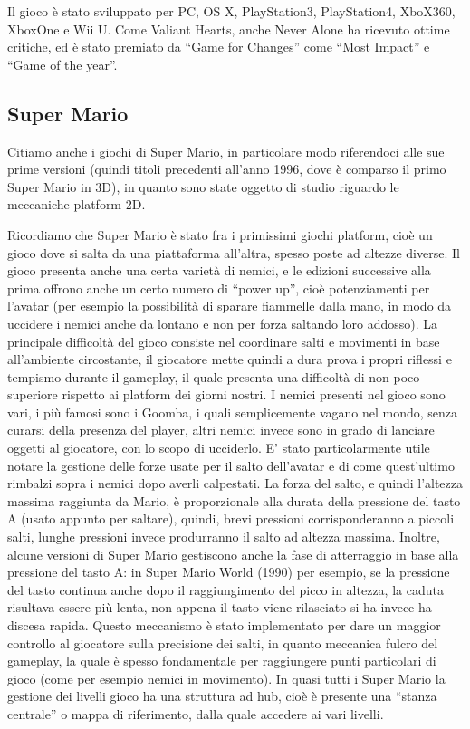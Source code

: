 Il gioco è stato sviluppato per PC, OS X, PlayStation3, PlayStation4, XboX360, XboxOne e Wii U. Come Valiant Hearts, anche Never Alone ha ricevuto ottime critiche, ed è stato premiato da ``Game for Changes'' come ``Most Impact'' e ``Game of the year''.



\subsection{Super Mario}

Citiamo anche i giochi di Super Mario, in particolare modo riferendoci alle sue prime versioni (quindi titoli precedenti all'anno 1996, dove è comparso il primo Super Mario in 3D), in quanto sono state oggetto di studio riguardo le meccaniche platform 2D.

Ricordiamo che Super Mario è stato fra i primissimi giochi platform, cioè un gioco dove si salta da una piattaforma all'altra, spesso poste ad altezze diverse. Il gioco presenta anche una certa varietà di nemici, e le edizioni successive alla prima offrono anche un certo numero di ``power up'', cioè potenziamenti per l'avatar (per esempio la possibilità di sparare fiammelle dalla mano, in modo da uccidere i nemici anche da lontano e non per forza saltando loro addosso).
La principale difficoltà del gioco consiste nel coordinare salti e movimenti in base all'ambiente circostante, il giocatore mette quindi a dura prova i propri riflessi e tempismo durante il gameplay, il quale presenta una difficoltà di non poco superiore rispetto ai platform dei giorni nostri. I nemici presenti nel gioco sono vari, i più famosi sono i Goomba, i quali semplicemente vagano nel mondo, senza curarsi della presenza del player, altri nemici invece sono in grado di lanciare oggetti al giocatore, con lo scopo di ucciderlo.
E' stato particolarmente utile notare la gestione delle forze usate per il salto dell'avatar e di come quest'ultimo rimbalzi sopra i nemici dopo averli calpestati. La forza del salto, e quindi l'altezza massima raggiunta da Mario, è proporzionale alla durata della pressione del tasto A (usato appunto per saltare), quindi, brevi pressioni corrisponderanno a piccoli salti, lunghe pressioni invece produrranno il salto ad altezza massima. Inoltre, alcune versioni di Super Mario gestiscono anche la fase di atterraggio in base alla pressione del tasto A: in Super Mario World (1990)  per esempio, se la pressione del tasto continua anche dopo il raggiungimento del picco in altezza, la caduta risultava essere più lenta, non appena il tasto viene rilasciato si ha invece ha discesa rapida. Questo meccanismo è stato implementato per dare un maggior controllo al giocatore sulla precisione dei salti, in quanto meccanica fulcro del gameplay, la quale è spesso fondamentale per raggiungere punti particolari di gioco (come per esempio nemici in movimento).
In quasi tutti i Super Mario la gestione dei livelli gioco ha una struttura ad hub, cioè è presente una ``stanza centrale'' o mappa di riferimento, dalla quale accedere ai vari livelli.


